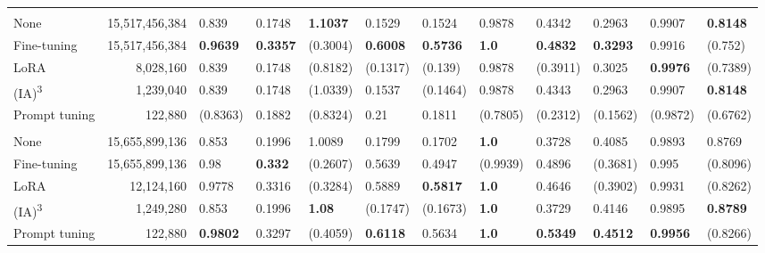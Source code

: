 \begin{table*}[htbp]
\begin{threeparttable}
\begin{tabularx}{\textwidth}{lrLLLLL!{\color{white}\ }LLLLL}
         \bigstrut \\*
        None & 15,517,456,384 & 0.839 & 0.1748 & \textbf{1.1037} & 0.1529 & 0.1524 & 0.9878 & 0.4342 & 0.2963 & 0.9907 & \textbf{0.8148} \\
        Fine-tuning & 15,517,456,384 & \textbf{0.9639} & \textbf{0.3357} & (0.3004) & \textbf{0.6008} & \textbf{0.5736} & \textbf{1.0} & \textbf{0.4832} & \textbf{0.3293} & 0.9916 & (0.752) \\
        LoRA & 8,028,160 & 0.839 & 0.1748 & (0.8182) & (0.1317) & (0.139) & 0.9878 & (0.3911) & 0.3025 & \textbf{0.9976} & (0.7389) \\
        (IA)\textsuperscript{3} & 1,239,040 & 0.839 & 0.1748 & (1.0339) & 0.1537 & (0.1464) & 0.9878 & 0.4343 & 0.2963 & 0.9907 & \textbf{0.8148} \\
        Prompt tuning & 122,880 & (0.8363) & 0.1882 & (0.8324) & 0.21 & 0.1811 & (0.7805) & (0.2312) & (0.1562) & (0.9872) & (0.6762) \\

         \bigstrut \\*
        None & 15,655,899,136 & 0.853 & 0.1996 & 1.0089 & 0.1799 & 0.1702 & \textbf{1.0} & 0.3728 & 0.4085 & 0.9893 & 0.8769 \\
        Fine-tuning & 15,655,899,136 & 0.98 & \textbf{0.332} & (0.2607) & 0.5639 & 0.4947 & (0.9939) & 0.4896 & (0.3681) & 0.995 & (0.8096) \\
        LoRA & 12,124,160 & 0.9778 & 0.3316 & (0.3284) & 0.5889 & \textbf{0.5817} & \textbf{1.0} & 0.4646 & (0.3902) & 0.9931 & (0.8262) \\
        (IA)\textsuperscript{3} & 1,249,280 & 0.853 & 0.1996 & \textbf{1.08} & (0.1747) & (0.1673) & \textbf{1.0} & 0.3729 & 0.4146 & 0.9895 & \textbf{0.8789} \\
        Prompt tuning & 122,880 & \textbf{0.9802} & 0.3297 & (0.4059) & \textbf{0.6118} & 0.5634 & \textbf{1.0} & \textbf{0.5349} & \textbf{0.4512} & \textbf{0.9956} & (0.8266) \\


\end{tabularx}
\end{threeparttable}
\end{table*}
